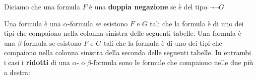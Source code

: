 \begin{flushleft}

Diciamo che una formula $F$ è una \textbf{doppia negazione} se è del tipo $\neg{\neg{G}}$ 

\bigskip

Una formula è una $\alpha$-formula se esistono $F$ e $G$ tali che la formula è di uno dei
tipi che compaiono nella colonna sinistra delle seguenti tabelle. Una formula è una
$\beta$-formula se esistono $F$ e $G$ tali che la formula è di uno dei tipi che compaiono
nella colonna sinistra della seconda delle seguenti tabelle. In entrambi i casi i 
\textbf{ridotti} di una $\alpha$- o $\beta$-formula sono le formule che compaiono nelle due
più a destra:

\begin{center}
\begin{tabular}{|c|c|c|}
    \hline
    
    \hline
\end{tabular}
\end{center}

\end{flushleft}